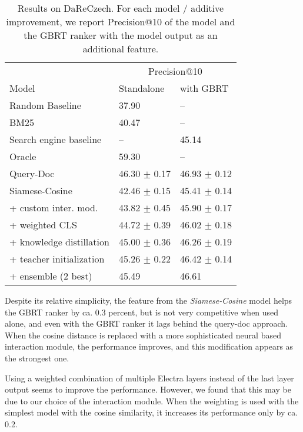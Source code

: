\documentclass[letterpaper]{article} \usepackage{aaai22 }  \usepackage{times}  \usepackage{helvet}  \usepackage{courier}  \usepackage[hyphens]{url}  \usepackage{graphicx} \usepackage{amsmath,amsfonts,amssymb, mathabx,bm,bbm}
\begin{document}
\begin{table}[!htb]
    \centering\footnotesize
    \begin{tabular}{lll}\toprule
    & \multicolumn{2}{c}{Precision@10}\\
    Model & Standalone & with GBRT \\\midrule
    Random Baseline & 37.90 & -- \\
    BM25 & 40.47 & -- \\
    Search engine baseline & -- & 45.14 \\
    Oracle & 59.30 & -- \\\midrule
    
    Query-Doc & 46.30 $\pm$ 0.17 & 46.93 $\pm$ 0.12 \\\midrule
    
    Siamese-Cosine & 42.46 $\pm$ 0.15	& 45.41 $\pm$ 0.14 \\
     + custom inter. mod. & 43.82 $\pm$ 0.45 & 45.90 $\pm$ 0.17 \\
     + weighted CLS & 44.72 $\pm$ 0.39	& 46.02 $\pm$ 0.18 \\
     + knowledge distillation & 45.00 $\pm$ 0.36 & 46.26 $\pm$ 0.19\\
     + teacher initialization & 45.26 $\pm$ 0.22 & 46.42 $\pm$ 0.14\\
     + ensemble (2 best) & 45.49 & 46.61  \\\bottomrule
    \end{tabular}
    \caption{Results on DaReCzech. For each model / additive improvement, we report Precision@10 of the model and the GBRT ranker with the model output as an additional feature.}
    \label{table:results_main}
\end{table}

Despite its relative simplicity, the feature from the \textit{Siamese-Cosine} model helps the GBRT ranker by ca. 0.3 percent, but is not very competitive when used alone, and even with the GBRT ranker it lags behind the query-doc approach. When the cosine distance is replaced with a more sophisticated neural based interaction module, the performance improves, and this modification appears as the strongest one.

Using a weighted combination of multiple Electra layers instead of the last layer output seems to improve the performance. However, we found that this may be due to our choice of the interaction module. When the weighting is used with the simplest model with the cosine similarity, it increases its performance only by ca. 0.2.
\end{document}
